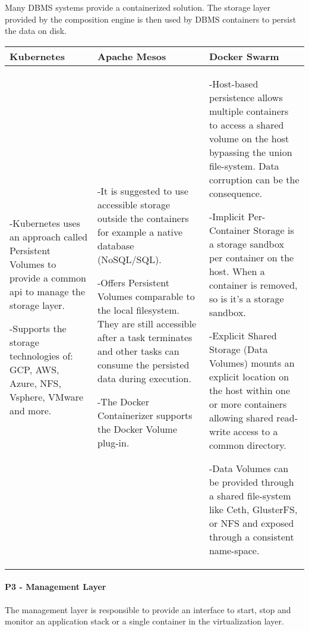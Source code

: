 Many DBMS systems provide a containerized solution. The storage layer provided
by the composition engine is then used by DBMS containers to persist the data on
disk.

\begin{center}
  \begin{tabular}{ | p{4.5cm} | p{4.5cm} | p{4.5cm} | }
    \hline
    \textbf{Kubernetes}&\textbf{Apache Mesos}&\textbf{Docker Swarm}\\\hline
    -Kubernetes uses an approach called Persistent Volumes to provide a common
    \gls{api} to manage the storage layer. 
    
    -Supports the storage technologies of: GCP, AWS, Azure, NFS, Vsphere,
    VMware and more.&

    -It is suggested to use accessible storage outside the containers for
    example a native database (NoSQL/SQL).
    
    -Offers Persistent Volumes comparable to the local filesystem. They
    are still accessible after a task terminates and other tasks can consume the
    persisted data during execution.
    
    -The Docker Containerizer supports the Docker Volume plug-in. & 
     
    -Host-based persistence allows multiple containers to access a shared
    volume on the host bypassing the union file-system. Data corruption can be
    the consequence.
    
    -Implicit Per-Container Storage is a storage sandbox per container on
    the host. When a container is removed, so is it's a storage sandbox.
    
    -Explicit Shared Storage (Data Volumes) mounts an explicit location on the
    host within one or more containers allowing shared read-write access to
    a common directory.
    
    -Data Volumes can be provided through a shared file-system like Ceth,
    GlusterFS, or NFS and exposed through a consistent name-space.\\
    \hline
  \end{tabular}
\end{center}

\newpage
\paragraph{P3 - Management Layer}

The management layer is responsible to provide an interface to start, stop and
monitor an application stack or a single container in the virtualization layer.

